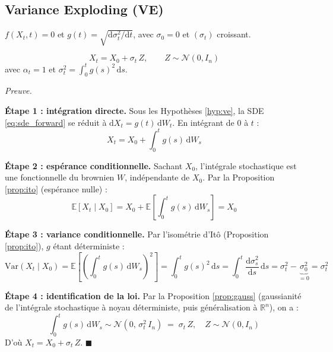 \documentclass[12pt]{article}
\renewcommand{\qedsymbol}{$\blacksquare$}
\renewenvironment{proof}[1][\proofname]{%
  \par\medskip\noindent
  \textit{\color{proofgray}#1.}\enspace\ignorespaces
}{\hfill\qedsymbol\par\medskip}
\renewcommand{\proofname}{Preuve}
\begin{document}
\subsection{Variance Exploding (VE)}

\begin{hypothesebox}[VE]
\label{hyp:ve}
$f(X_t, t) = 0$ et $g(t) = \sqrt{\mathrm{d}\sigma_t^2/\mathrm{d}t}$, avec $\sigma_0 = 0$ et $(\sigma_t)$ croissant.
\end{hypothesebox}

\begin{resultbox}
\label{res:ve}
\begin{equation}
    \boxed{X_t = X_0 + \sigma_t\, Z, \qquad Z \sim \mathcal{N}(0, I_n)}
    \label{eq:ve_marginal}
\end{equation}
avec $\alpha_t = 1$ et $\sigma_t^2 = \int_0^t g(s)^2\, \mathrm{d}s$.
\end{resultbox}

  \begin{proof}







\textbf{Étape 1 : intégration directe.} Sous les Hypothèses \ref{hyp:ve}, la SDE \eqref{eq:sde_forward} se réduit à $\mathrm{d}X_t = g(t)\, \mathrm{d}W_t$. En intégrant de $0$ à $t$ :
\[
X_t = X_0 + \int_0^t g(s)\, \mathrm{d}W_s
\]

\textbf{Étape 2 : espérance conditionnelle.} Sachant $X_0$, l'intégrale stochastique est une fonctionnelle du brownien $W$, indépendante de $X_0$. Par la Proposition \ref{prop:ito} (espérance nulle) :
\[
\mathbb{E}[X_t \mid X_0] = X_0 + \mathbb{E}\!\left[\int_0^t g(s)\, \mathrm{d}W_s\right] = X_0
\]

\textbf{Étape 3 : variance conditionnelle.} Par l'isométrie d'Itô (Proposition \ref{prop:ito}), $g$ étant déterministe :
\[
\mathrm{Var}(X_t \mid X_0) = \mathbb{E}\!\left[\left(\int_0^t g(s)\, \mathrm{d}W_s\right)^{\!2}\right] = \int_0^t g(s)^2\, \mathrm{d}s = \int_0^t \frac{\mathrm{d}\sigma_s^2}{\mathrm{d}s}\, \mathrm{d}s = \sigma_t^2 - \underbrace{\sigma_0^2}_{=0} = \sigma_t^2
\]

\textbf{Étape 4 : identification de la loi.} Par la Proposition \ref{prop:gauss} (gaussianité de l'intégrale stochastique à noyau déterministe, puis généralisation à $\mathbb{R}^n$), on a :
\[
\int_0^t g(s)\, \mathrm{d}W_s \sim \mathcal{N}(0,\, \sigma_t^2\, I_n) \;=\; \sigma_t\, Z, \quad Z \sim \mathcal{N}(0, I_n)
\]
D'où $X_t = X_0 + \sigma_t\, Z$.
\end{proof}
\end{document}
